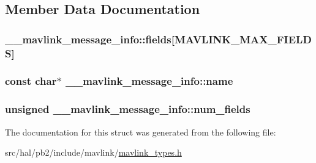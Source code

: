 \subsection{Member Data Documentation}
\subsubsection[{\texorpdfstring{fields}{fields}}]{ \+\_\+\+\_\+mavlink\+\_\+message\+\_\+info\+::fields\mbox{[}{\bf M\+A\+V\+L\+I\+N\+K\+\_\+\+M\+A\+X\+\_\+\+F\+I\+E\+L\+DS}\mbox{]}}\hypertarget{struct____mavlink__message__info_a4a15f20958b43cb1282575c6da67a37b}{}\label{struct____mavlink__message__info_a4a15f20958b43cb1282575c6da67a37b}
\subsubsection[{\texorpdfstring{name}{name}}]{\setlength{\rightskip}{0pt plus 5cm}const char$\ast$ \+\_\+\+\_\+mavlink\+\_\+message\+\_\+info\+::name}\hypertarget{struct____mavlink__message__info_a5e8b48c51cb8bc44bd844d1c3049ee32}{}\label{struct____mavlink__message__info_a5e8b48c51cb8bc44bd844d1c3049ee32}
\subsubsection[{\texorpdfstring{num\+\_\+fields}{num_fields}}]{\setlength{\rightskip}{0pt plus 5cm}unsigned \+\_\+\+\_\+mavlink\+\_\+message\+\_\+info\+::num\+\_\+fields}\hypertarget{struct____mavlink__message__info_a0c343bcc1f27884e8c2ab875e7efc2e5}{}\label{struct____mavlink__message__info_a0c343bcc1f27884e8c2ab875e7efc2e5}


The documentation for this struct was generated from the following file\+:\begin{DoxyCompactItemize}
\item 
src/hal/pb2/include/mavlink/\hyperlink{mavlink__types_8h}{mavlink\+\_\+types.\+h}\end{DoxyCompactItemize}
